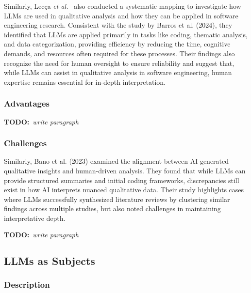 \documentclass[11pt]{article}
\newcommand{\todo}[1]{{\textbf{TODO:}\ \textit{#1}}} %
\begin{document}
Similarly, Lecça \textit{et al.}~\cite{leça2024applicationsimplicationslargelanguage} also conducted a systematic mapping to investigate how LLMs are used in qualitative analysis and how they can be applied in software engineering research. Consistent with the study by Barros et al. (2024), they identified that LLMs are applied primarily in tasks like coding, thematic analysis, and data categorization, providing efficiency by reducing the time, cognitive demands, and resources often required for these processes. Their findings also recognize the need for human oversight to ensure reliability and suggest that, while LLMs can assist in qualitative analysis in software engineering, human expertise remains essential for in-depth interpretation.

\subsubsection{Advantages}

\todo{write paragraph}

\subsubsection{Challenges}

Similarly, Bano et al. (2023) examined the alignment between AI-generated qualitative insights and human-driven analysis. They found that while LLMs can provide structured summaries and initial coding frameworks, discrepancies still exist in how AI interprets nuanced qualitative data. Their study highlights cases where LLMs successfully synthesized literature reviews by clustering similar findings across multiple studies, but also noted challenges in maintaining interpretative depth.



\todo{write paragraph}


\subsection{LLMs as Subjects}

\subsubsection{Description}
\end{document}
